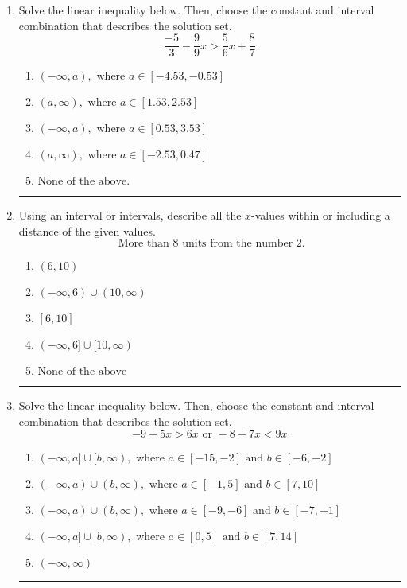 \documentclass[14pt]{extbook}
\newcommand{\litem}[1]{\item#1\hspace*{-1cm}\rule{\textwidth}{0.4pt}}
\begin{document}
\begin{enumerate}
{\begin{enumerate}[label=\Alph*.]
\end{enumerate} }
\litem{
Solve the linear inequality below. Then, choose the constant and interval combination that describes the solution set.\[ \frac{-5}{3} - \frac{9}{9} x > \frac{5}{6} x + \frac{8}{7} \]\begin{enumerate}[label=\Alph*.]
\item \( (-\infty, a), \text{ where } a \in [-4.53, -0.53] \)
\item \( (a, \infty), \text{ where } a \in [1.53, 2.53] \)
\item \( (-\infty, a), \text{ where } a \in [0.53, 3.53] \)
\item \( (a, \infty), \text{ where } a \in [-2.53, 0.47] \)
\item \( \text{None of the above}. \)

\end{enumerate} }
\litem{
Using an interval or intervals, describe all the $x$-values within or including a distance of the given values.\[ \text{ More than } 8 \text{ units from the number } 2. \]\begin{enumerate}[label=\Alph*.]
\item \( (6, 10) \)
\item \( (-\infty, 6) \cup (10, \infty) \)
\item \( [6, 10] \)
\item \( (-\infty, 6] \cup [10, \infty) \)
\item \( \text{None of the above} \)

\end{enumerate} }
\litem{
Solve the linear inequality below. Then, choose the constant and interval combination that describes the solution set.\[ -9 + 5 x > 6 x \text{ or } -8 + 7 x < 9 x \]\begin{enumerate}[label=\Alph*.]
\item \( (-\infty, a] \cup [b, \infty), \text{ where } a \in [-15, -2] \text{ and } b \in [-6, -2] \)
\item \( (-\infty, a) \cup (b, \infty), \text{ where } a \in [-1, 5] \text{ and } b \in [7, 10] \)
\item \( (-\infty, a) \cup (b, \infty), \text{ where } a \in [-9, -6] \text{ and } b \in [-7, -1] \)
\item \( (-\infty, a] \cup [b, \infty), \text{ where } a \in [0, 5] \text{ and } b \in [7, 14] \)
\item \( (-\infty, \infty) \)


\end{enumerate}}
\end{enumerate}
\end{document}
